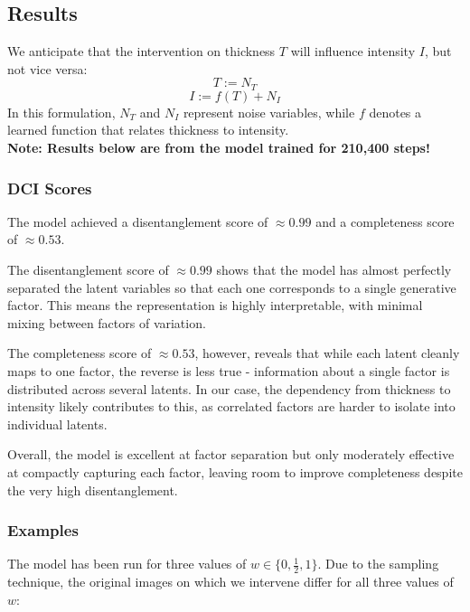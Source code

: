 \documentclass{article}
\begin{document}
	\subsection{Results}
	
	We anticipate that the intervention on thickness $T$ will influence intensity $I$, but not vice versa:
	$$ T := N_T $$
	$$ I := f(T) + N_I $$
	In this formulation, $N_T$ and $N_I$ represent noise variables, while $f$ denotes a learned function that relates thickness to intensity. \\
	
	\textbf{\normalsize Note: Results below are from the model trained for 210,400 steps!}
	
	\subsubsection*{DCI Scores}
	
	The model achieved a disentanglement score of $\approx 0.99$ and a completeness score of $\approx 0.53$.   
	
	The disentanglement score of $\approx 0.99$ shows that the model has almost perfectly separated the latent variables so that each one corresponds to a single generative factor. This means the representation is highly interpretable, with minimal mixing between factors of variation.  
	
	The completeness score of $\approx 0.53$, however, reveals that while each latent cleanly maps to one factor, the reverse is less true - information about a single factor is distributed across several latents. In our case, the dependency from thickness to intensity likely contributes to this, as correlated factors are harder to isolate into individual latents.  
	
	Overall, the model is excellent at factor separation but only moderately effective at compactly capturing each factor, leaving room to improve completeness despite the very high disentanglement.
	
	\subsubsection*{Examples}
	
	The model has been run for three values of $w \in \{0, \frac{1}{2}, 1\}$. Due to the sampling technique, the original images on which we intervene differ for all three values of $w$:
	
\end{document}
